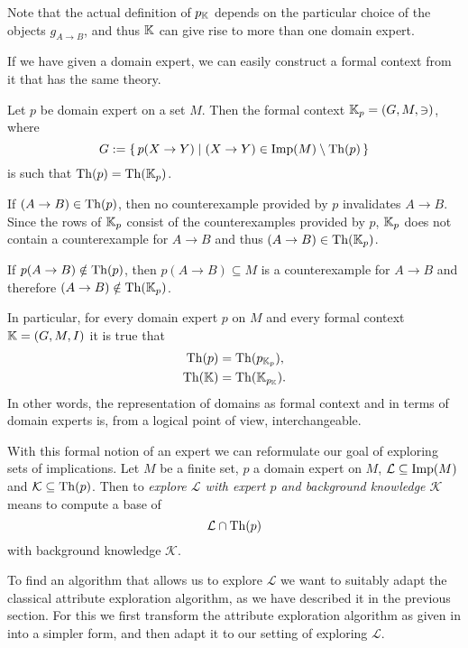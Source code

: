 Note that the actual definition of $p_{{\mathbb{K}}}$ depends on the particular choice of the
objects $g_{A \to B}$, and thus ${\mathbb{K}}$ can give rise to more than one domain expert.

If we have given a domain expert, we can easily construct a formal context from it that
has the same theory.

\begin{Proposition}
  \label{prop:domain-from-domain-expert}
  Let $p$ be domain expert on a set $M$.  Then the formal context ${\mathbb{K}}_p = (G, M, \ni)$,
  where
  \begin{equation*}
    G := {\{\, p(X \to Y) \mid (X \to Y) \in \operatorname{Imp}(M) \setminus \operatorname{Th}(p) \,\}}
  \end{equation*}
  is such that $\operatorname{Th}(p) = \operatorname{Th}({\mathbb{K}}_p)$.
\end{Proposition}
\begin{Proof}
  If $(A \to B) \in \operatorname{Th}(p)$, then no counterexample provided by $p$ invalidates $A \to
  B$.  Since the rows of ${\mathbb{K}}_p$ consist of the counterexamples provided by $p$, ${\mathbb{K}}_p$ does not contain a counterexample for $A \to B$ and thus $(A \to B) \in \operatorname{Th}({\mathbb{K}}_p)$.

  If $p(A \to B) \notin \operatorname{Th}(p)$, then $p(A \to B) \subseteq M$ is a counterexample for $A
  \to B$ and therefore $(A \to B) \notin \operatorname{Th}({\mathbb{K}}_p)$.
\end{Proof}

In particular, for every domain expert $p$ on $M$ and every formal context ${\mathbb{K}} = (G,
M, I)$ it is true that
\begin{align*}
  \operatorname{Th}(p) &= \operatorname{Th}(p_{{\mathbb{K}}_p}), \\
  \operatorname{Th}({\mathbb{K}}) &= \operatorname{Th}({\mathbb{K}}_{p_{{\mathbb{K}}}}).
\end{align*}
In other words, the representation of domains as formal context and in terms of domain
experts is, from a logical point of view, interchangeable.

With this formal notion of an expert we can reformulate our goal of exploring sets of
implications.  Let $M$ be a finite set, $p$ a domain expert on $M$, $\mathcal{L} \subseteq
\operatorname{Imp}(M)$ and $\mathcal{K} \subseteq \operatorname{Th}(p)$.  Then to \emph{explore $\mathcal{L}$ with
  expert $p$ and background knowledge $\mathcal{K}$} means to compute a base of
\begin{equation*}
  \mathcal{L} \cap \operatorname{Th}(p)
\end{equation*}
with background knowledge $\mathcal{K}$.

To find an algorithm that allows us to explore $\mathcal{L}$ we want to suitably adapt the
classical attribute exploration algorithm, as we have described it in the previous
section.  For this we first transform the attribute exploration algorithm as given in
 into a simpler form, and then adapt it to our setting of
exploring $\mathcal{L}$.

